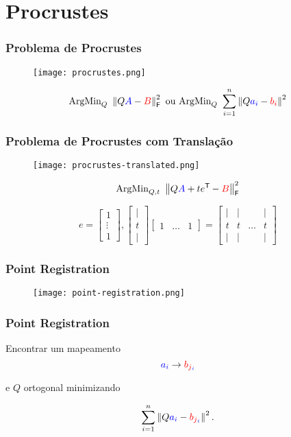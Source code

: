 
\section{Procrustes}

\begin{frame}[fragile]
  \frametitle{Problema de Procrustes}
  \begin{figure}
    \centering
    \texttt{[image: procrustes.png]}
  \end{figure}

  \[\text{ArgMin}_{Q}\,\, \left\lVert Q\textcolor{blue}{A} - \textcolor{red}{B}\right\rVert_\mathsf{F}^2 \text{  ou  } \text{ArgMin}_{Q}\,\, \sum_{i=1}^{n} \left\lVert Q\textcolor{blue}{a_i} - \textcolor{red}{b_i}\right\rVert^2\]
\end{frame}

\begin{frame}[fragile]
  \frametitle{Problema de Procrustes com Translação}
  \begin{figure}
    \centering
    \texttt{[image: procrustes-translated.png]}
  \end{figure}

  \[\text{ArgMin}_{Q,t}\,\, \left\lVert Q\textcolor{blue}{A} + t e^{\mathsf{T}\mkern-1mu} - \textcolor{red}{B}\right\rVert_\mathsf{F}^2\]

  \[e = \begin{bmatrix} 1 \\ \vdots \\ 1 \end{bmatrix}, \begin{bmatrix} \vert \\ t \\ \vert \end{bmatrix}\begin{bmatrix} 1 & \dots & 1 \end{bmatrix} = \begin{bmatrix} \vert & \vert & & \vert \\ t & t & \dots & t \\ \vert & \vert & & \vert \end{bmatrix}\]
\end{frame}

\begin{frame}
  \frametitle{Point Registration}
  \begin{figure}
    \centering
    \texttt{[image: point-registration.png]}
  \end{figure}
\end{frame}

\begin{frame}
  \frametitle{Point Registration}
  \begin{center}
    Encontrar um mapeamento \[\textcolor{blue}{a_i} \to \textcolor{red}{b}_{\textcolor{red}{j}_{\textcolor{blue}{i}}}\]

    e $Q$ ortogonal minimizando

    \[\sum_{i=1}^{n} \left\lVert Q\textcolor{blue}{a_{i}} - \textcolor{red}{b}_{\textcolor{red}{j}_{\textcolor{blue}{i}}}\right\rVert^2.\]
  \end{center}
\end{frame}
